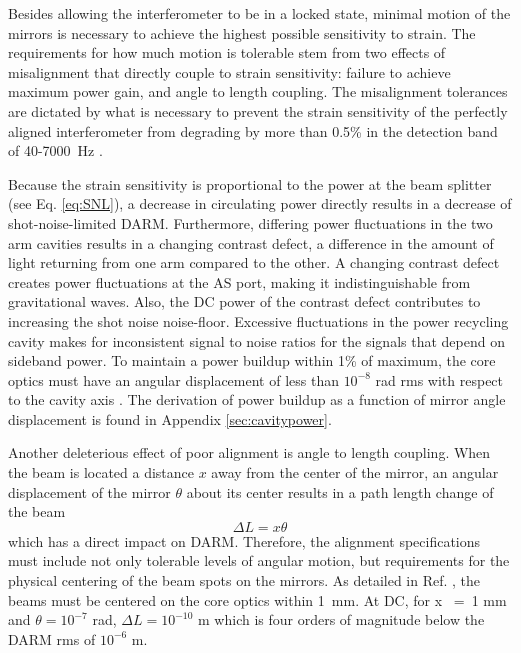 
Besides allowing the interferometer to be in a locked state, minimal motion of the mirrors is necessary to achieve the highest possible sensitivity to strain. The requirements for how much motion is tolerable stem from two effects of misalignment that directly couple to strain sensitivity: failure to achieve maximum power gain, and angle to length coupling. The misalignment tolerances are dictated by what is necessary to prevent the strain sensitivity of the perfectly aligned interferometer from degrading by more than 0.5\% in the detection band of 40-7000~Hz \cite{Fritschel1997Alignment}.

Because the strain sensitivity is proportional to the power at the beam splitter (see Eq. \ref{eq:SNL}), a decrease in circulating power directly results in a decrease of shot-noise-limited DARM. Furthermore, differing power fluctuations in the two arm cavities results in a changing contrast defect, a difference in the amount of light returning from one arm compared to the other. A changing contrast defect creates power fluctuations at the AS port, making it indistinguishable from gravitational waves. Also, the DC power of the contrast defect contributes to increasing the shot noise noise-floor. Excessive fluctuations in the power recycling cavity makes for inconsistent signal to noise ratios for the signals that depend on sideband power. To maintain a power buildup within 1\% of maximum, the core optics must have an angular displacement of less than $10^{-8}$ rad rms with respect to the cavity axis \cite{ISCGroup1998ASC}. The derivation of power buildup as a function of mirror angle displacement is found in Appendix \ref{sec:cavitypower}.

Another deleterious effect of poor alignment is angle to length coupling. 
When the beam is located a distance $x$  away from the center of the mirror, an
angular displacement of the mirror $\theta$ about its center results in a path
length change of the beam
\begin{equation}
\Delta{L} = x \theta
\end{equation}
which has a direct impact on DARM. Therefore, the alignment specifications must include not only tolerable levels of angular motion, but requirements for the physical centering of the beam spots on the mirrors. As detailed in Ref. \cite{ISCGroup1998ASC}, the beams must be centered on the core optics within 1~mm. At DC, for x ~=~1 mm and $\theta = 10^{-7}$ rad, $\Delta{L} = 10^{-10}$ m which is four orders of magnitude below the DARM rms of $10^{-6}$ m. 




